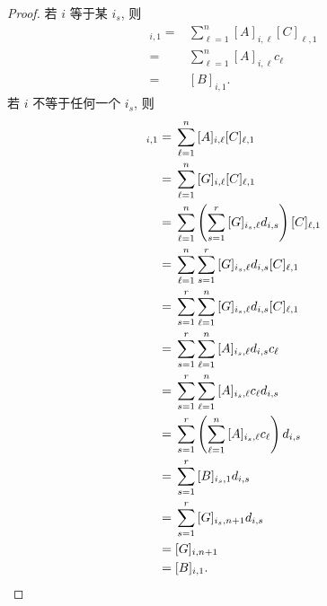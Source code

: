\begin{proof}
    若 \(i\) 等于某 \(i_s\), 则
    \begin{align*}
        [AC]_{i,1}
        = {} &
        \sum_{\ell = 1}^{n}
        {[A]_{i,\ell} [C]_{\ell,1}}
        \\
        = {} &
        \sum_{\ell = 1}^{n}
        {[A]_{i,\ell} c_\ell}
        \\
        = {} & [B]_{i,1}.
    \end{align*}
    若 \(i\) 不等于任何一个 \(i_s\), 则
    \begin{align*}
        [AC]_{i,1}
        = {} &
        \sum_{\ell = 1}^{n}
        {[A]_{i,\ell} [C]_{\ell,1}}
        \\
        = {} &
        \sum_{\ell = 1}^{n}
        {[G]_{i,\ell} [C]_{\ell,1}}
        \\
        = {} &
        \sum_{\ell = 1}^{n}
        {
        \left( \sum_{s = 1}^{r}
        {
            [G]_{i_s,\ell} d_{i,s}
        } \right) [C]_{\ell,1}
        }
        \\
        = {} &
        \sum_{\ell = 1}^{n}
        {
        \sum_{s = 1}^{r}
        {
        [G]_{i_s,\ell} d_{i,s} [C]_{\ell,1}
        }
        }
        \\
        = {} &
        \sum_{s = 1}^{r}
        {
        \sum_{\ell = 1}^{n}
        {
        [G]_{i_s,\ell} d_{i,s} [C]_{\ell,1}
        }
        }
        \\
        = {} &
        \sum_{s = 1}^{r}
        {
        \sum_{\ell = 1}^{n}
        {
        [A]_{i_s,\ell} d_{i,s} c_\ell
        }
        }
        \\
        = {} &
        \sum_{s = 1}^{r}
        {
        \sum_{\ell = 1}^{n}
        {
        [A]_{i_s,\ell} c_\ell d_{i,s}
        }
        }
        \\
        = {} &
        \sum_{s = 1}^{r}
        {
        \left(\sum_{\ell = 1}^{n}
        {
            [A]_{i_s,\ell} c_\ell
        }\right)
        d_{i,s}
        }
        \\
        = {} &
        \sum_{s = 1}^{r}
        {[B]_{i_s,1} d_{i,s}}
        \\
        = {} &
        \sum_{s = 1}^{r}
        {[G]_{i_s,n+1} d_{i,s}}
        \\
        = {} &
        [G]_{i,n+1}
        \\
        = {} &
        [B]_{i,1}.
        \qedhere
    \end{align*}
\end{proof}

